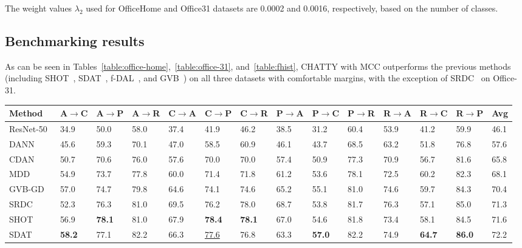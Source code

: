 \documentclass[10pt,twocolumn,letterpaper]{article}
\begin{document}
The weight values $\lambda_2$ used for OfficeHome and Office31 datasets are 0.0002 and 0.0016, respectively, based on the number of classes. 

\subsection{Benchmarking results}

As can be seen in Tables~\ref{table:office-home},~\ref{table:office-31}, and~\ref{table:fhist}, CHATTY with MCC outperforms the previous methods (including SHOT~\cite{shot}, SDAT~\cite{sdat}, f-DAL~\cite{fdal}, and GVB~\cite{gvb})  on all three datasets with comfortable margins, with the exception of SRDC~\cite{srdc} on Office-31.

\begin{table*}
\begin{center}
\begin{tabular}{|l|p{0.7cm}|p{0.7cm}|p{0.7cm}|p{0.7cm}|p{0.7cm}|p{0.7cm}|p{0.7cm}|p{0.7cm}|p{0.7cm}|p{0.7cm}|p{0.7cm}|p{0.7cm}|p{0.5cm}|}
\hline
Method	&	A$\rightarrow$C	&	A$\rightarrow$P	&	A$\rightarrow$R	&	C$\rightarrow$A	&	C$\rightarrow$P	&	C$\rightarrow$R	&	P$\rightarrow$A	&	P$\rightarrow$C	&	P$\rightarrow$R	&	R$\rightarrow$A	&	R$\rightarrow$C	&	R$\rightarrow$P	&	Avg	\\
\hline
ResNet-50~\cite{resnet}	&	34.9	&	50.0	&	58.0	&	37.4	&	41.9	&	46.2	&	38.5	&	31.2	&	60.4	&	53.9	&	41.2	&	59.9	&	46.1	\\
DANN~\cite{dann}	&	45.6	&	59.3	&	70.1	&	47.0	&	58.5	&	60.9	&	46.1	&	43.7	&	68.5	&	63.2	&	51.8	&	76.8	&	57.6	\\
CDAN~\cite{cdan}	&	50.7	&	70.6	&	76.0	&	57.6	&	70.0	&	70.0	&	57.4  &	50.9	&	77.3	&	70.9	&	56.7	&	81.6	&	65.8	\\
MDD~\cite{mdd} &	54.9	&	73.7	&	77.8	&	60.0	&	71.4	&	71.8	&	61.2	&	53.6	&	78.1	&	72.5	&	60.2	&	82.3	&	68.1	\\
GVB-GD~\cite{gvb} &	57.0	&	74.7	&	79.8	&	64.6	&	74.1	&	74.6	&	65.2	&	55.1	&	81.0	&	74.6	&	59.7	&	84.3	&	70.4	\\
SRDC~\cite{srdc} &	52.3	&	76.3	&	81.0	&	69.5	&	76.2	&	78.0	&	68.7	&	53.8	&	81.7	&	76.3	&	57.1	&	85.0	&	71.3	\\
SHOT~\cite{shot} &	56.9	&	\textbf{78.1}	&	81.0	&	67.9	&	\textbf{78.4}	&	\textbf{78.1}	&	67.0	&	54.6	&	81.8	&	73.4	&	58.1	&	84.5	&	71.6	\\
SDAT	~\cite{sdat}&	\textbf{58.2}	&	77.1	&	82.2	&	66.3	&	\underline{77.6} &	76.8	&	63.3	&	\textbf{57.0}	&	82.2	&	74.9	&	\textbf{64.7}	&	\textbf{86.0}	&	72.2	\\

\end{tabular}
\end{center}
\end{table*}
\end{document}
